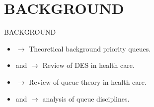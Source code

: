 \section{BACKGROUND}
\begin{frame}{BACKGROUND}
\begin{itemize}
    \item \cite{cobham1954priority} $\rightarrow$ Theoretical background priority queues.
    \item \cite{jun1999application}  and \cite{thorwarth2009application} $\rightarrow$ Review of DES in health care.
    \item \cite{lakshmi2013application} $\rightarrow$ Review of queue theory in health care.
    \item \cite{shimshak1981priority} and \cite{ndukwe2011reducing} $\rightarrow$ analysis of queue disciplines.
\end{itemize}
\vspace{0.5cm}
    \begin{figure}
        \centering
    \end{figure}
\end{frame}